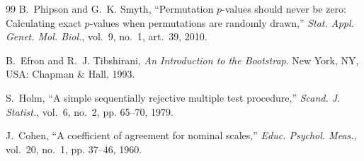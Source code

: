 \documentclass[conference]{IEEEtran}
\begin{document}
\begin{thebibliography}{99}
B.~Phipson and G.~K. Smyth, ``Permutation $p$-values should never be zero: Calculating exact $p$-values when permutations are randomly drawn,'' \emph{Stat. Appl. Genet. Mol. Biol.}, vol.~9, no.~1, art.~39, 2010.

B.~Efron and R.~J. Tibshirani, \emph{An Introduction to the Bootstrap}. New York, NY, USA: Chapman \& Hall, 1993.

S.~Holm, ``A simple sequentially rejective multiple test procedure,'' \emph{Scand. J. Statist.}, vol.~6, no.~2, pp. 65--70, 1979.

J.~Cohen, ``A coefficient of agreement for nominal scales,'' \emph{Educ. Psychol. Meas.}, vol.~20, no.~1, pp. 37--46, 1960.

\end{thebibliography}
\end{document}
